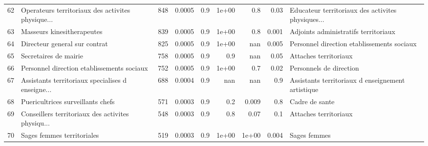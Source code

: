 \documentclass[11pt,a4paper]{article}
\begin{document}
\begin{tabular}{llrrrrrrl}
	62  &  Operateurs territoriaux des activites physique... &            848 &         0.0005 &                    0.9 &              1e+00 &                               0.8 &                                     0.03 &  Educateur territoriaux des activites physiques... \\
	63  &                         Masseurs kinesitherapeutes &            839 &         0.0005 &                    0.9 &              1e+00 &                               0.8 &                                    0.001 &               Adjoints administratifs territoriaux \\
	64  &                      Directeur general sur contrat &            825 &         0.0005 &                    0.9 &              1e+00 &                               nan &                                    0.005 &         Personnel direction etablissements sociaux \\
	65  &                              Secretaires de mairie &            758 &         0.0005 &                    0.9 &                0.9 &                               nan &                                     0.05 &                              Attaches territoriaux \\
	66  &         Personnel direction etablissements sociaux &            752 &         0.0005 &                    0.9 &              1e+00 &                               0.7 &                                     0.02 &                            Personnels de direction \\
	67  &  Assistants territoriaux specialises d enseigne... &            688 &         0.0004 &                    0.9 &                nan &                               nan &                                      0.9 &  Assistants territoriaux d enseignement artistique \\
	68  &                  Puericultrices surveillants chefs &            571 &         0.0003 &                    0.9 &                0.2 &                             0.009 &                                      0.8 &                                     Cadre de sante \\
	69  &  Conseillers territoriaux des activites physiqu... &            548 &         0.0003 &                    0.9 &                0.8 &                              0.07 &                                      0.1 &                              Attaches territoriaux \\
	70  &                         Sages femmes territoriales &            519 &         0.0003 &                    0.9 &              1e+00 &                             1e+00 &                                    0.004 &                                       Sages femmes \\

\end{tabular}
\end{document}
